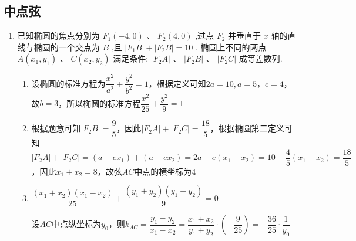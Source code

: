 \subsection*{中点弦}
\begin{enumerate}
    \item 已知椭圆的焦点分别为 ${F}_{1}\left( {-4,0}\right) \text{ 、 }{F}_{2}\left( {4,0}\right)$ ,过点 ${F}_{2}$ 并垂直于 $x$ 轴的直线与椭圆的一个交点为 $B$ ,且 $\left| {{F}_{1}B}\right|  + \left| {{F}_{2}B}\right|  = {10}$ . 椭圆上不同的两点 $A\left( {{x}_{1},{y}_{1}}\right) \text{ 、 }C\left( {{x}_{2},{y}_{2}}\right)$ 满足条件: $\left| {{F}_{2}A}\right| \text{ 、 }\left| {{F}_{2}B}\right| \text{ 、 }\left| {{F}_{2}C}\right|$ 成等差数列.
    \begin{jieda}
        \begin{enumerate}
            \item 设椭圆的标准方程为$\dfrac{x^2}{a^2}+\dfrac{y^2}{b^2} = 1$，根据定义可知$2a = 10, a= 5$，$c = 4$，故$b = 3$，所以椭圆的标准方程$\dfrac{x^2}{25}+\dfrac{y^2}{9} = 1$
            \item 根据题意可知$|F_2B| = \dfrac{9}{5}$，因此$|F_2A| + |F_2C| = \dfrac{18}{5}$，根据椭圆第二定义可知$|F_2A| + |F_2C| = (a-ex_1)+(a-ex_2) = 2a-e(x_1+x_2) = 10 - \dfrac{4}{5}(x_1+x_2) = \dfrac{18}{5}$，因此$x_1+x_2 = 8$，故弦$AC$中点的横坐标为$4$
            \item $\dfrac{(x_1+x_2)(x_1-x_2)}{25}+\dfrac{(y_1+y_2)(y_1-y_2)}{9} = 0$

            设$AC$中点纵坐标为$y_0$，则$k_{AC} = \dfrac{y_1-y_2}{x_1-x_2} = \dfrac{x_1+x_2}{y_1+y_2} \cdot \left(-\dfrac{9}{25}\right) = -\dfrac{36}{25} \cdot \dfrac{1}{y_0}$


\end{enumerate}
\end{jieda}
\end{enumerate}
